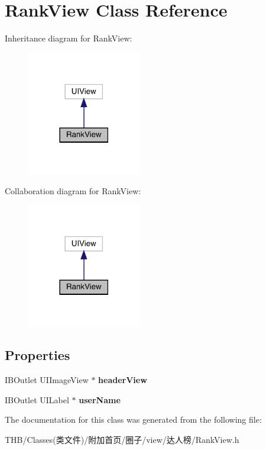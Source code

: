 \hypertarget{interface_rank_view}{}\section{Rank\+View Class Reference}
\label{interface_rank_view}


Inheritance diagram for Rank\+View\+:\nopagebreak
\begin{figure}[H]
\begin{center}
\leavevmode
\includegraphics[width=141pt]{interface_rank_view__inherit__graph}
\end{center}
\end{figure}


Collaboration diagram for Rank\+View\+:\nopagebreak
\begin{figure}[H]
\begin{center}
\leavevmode
\includegraphics[width=141pt]{interface_rank_view__coll__graph}
\end{center}
\end{figure}
\subsection*{Properties}
\begin{DoxyCompactItemize}
\item 
\mbox{\label{interface_rank_view_aa65f0c3fe7d59c0679006778c0dd5fef}} 
I\+B\+Outlet U\+I\+Image\+View $\ast$ {\bfseries header\+View}
\item 
\mbox{\label{interface_rank_view_a7c77cde4baef56e562b66d6722363565}} 
I\+B\+Outlet U\+I\+Label $\ast$ {\bfseries user\+Name}
\end{DoxyCompactItemize}


The documentation for this class was generated from the following file\+:\begin{DoxyCompactItemize}
\item 
T\+H\+B/\+Classes(类文件)/附加首页/圈子/view/达人榜/Rank\+View.\+h\end{DoxyCompactItemize}
